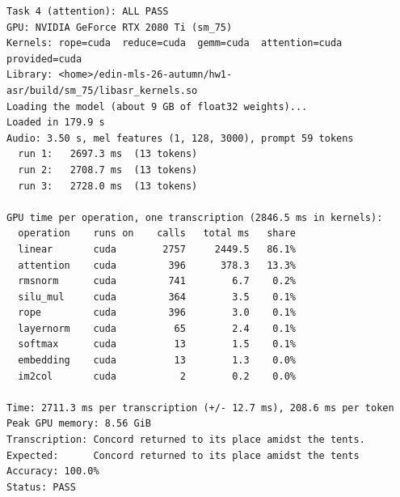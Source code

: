 \documentclass{article}
\begin{document}
{\begin{verbatim}
Task 4 (attention): ALL PASS
GPU: NVIDIA GeForce RTX 2080 Ti (sm_75)
Kernels: rope=cuda  reduce=cuda  gemm=cuda  attention=cuda  provided=cuda
Library: <home>/edin-mls-26-autumn/hw1-asr/build/sm_75/libasr_kernels.so
Loading the model (about 9 GB of float32 weights)...
Loaded in 179.9 s
Audio: 3.50 s, mel features (1, 128, 3000), prompt 59 tokens
  run 1:   2697.3 ms  (13 tokens)
  run 2:   2708.7 ms  (13 tokens)
  run 3:   2728.0 ms  (13 tokens)

GPU time per operation, one transcription (2846.5 ms in kernels):
  operation    runs on    calls   total ms   share
  linear       cuda        2757     2449.5   86.1%
  attention    cuda         396      378.3   13.3%
  rmsnorm      cuda         741        6.7    0.2%
  silu_mul     cuda         364        3.5    0.1%
  rope         cuda         396        3.0    0.1%
  layernorm    cuda          65        2.4    0.1%
  softmax      cuda          13        1.5    0.1%
  embedding    cuda          13        1.3    0.0%
  im2col       cuda           2        0.2    0.0%

Time: 2711.3 ms per transcription (+/- 12.7 ms), 208.6 ms per token
Peak GPU memory: 8.56 GiB
Transcription: Concord returned to its place amidst the tents.
Expected:      Concord returned to its place amidst the tents
Accuracy: 100.0%
Status: PASS
\end{verbatim}
}

\FloatBarrier
\end{document}

